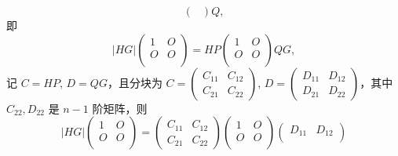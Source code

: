 \begin{enumerate}
\begin{enumerate}
\begin{enumerate}
\[\begin{pmatrix}
                                  \end{pmatrix}Q,\]
                              即
                              \[\lvert HG \rvert\begin{pmatrix}
                                      1 & O \\
                                      O & O \\
                                  \end{pmatrix} = HP\begin{pmatrix}
                                      1 & O \\
                                      O & O \\
                                  \end{pmatrix}QG,\]
                              记 $C = HP$, $D = QG$，且分块为 $C = \begin{pmatrix}
                                      C_{11} & C_{12} \\
                                      C_{21} & C_{22}
                                  \end{pmatrix}$, $D = \begin{pmatrix}
                                      D_{11} & D_{12} \\
                                      D_{21} & D_{22}
                                  \end{pmatrix}$，其中 $C_{22}, D_{22}$ 是 $n-1$ 阶矩阵，则
                              \[\lvert HG \rvert\begin{pmatrix}
                                      1 & O \\
                                      O & O \\
                                  \end{pmatrix} = \begin{pmatrix}
                                      C_{11} & C_{12} \\
                                      C_{21} & C_{22}
                                  \end{pmatrix} \begin{pmatrix}
                                      1 & O \\
                                      O & O \\
                                  \end{pmatrix} \begin{pmatrix}
                                      D_{11} & D_{12} \\

\end{pmatrix}\]
\end{enumerate}
\end{enumerate}
\end{enumerate}

